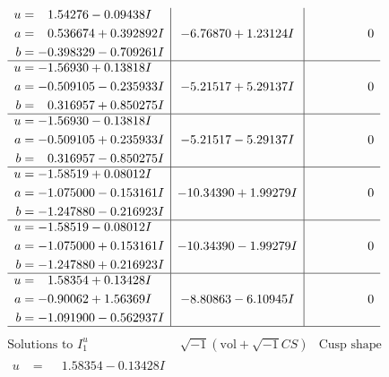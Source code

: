 \documentclass[1p]{elsarticle_modified}
\theoremstyle{definition}
\newcommand{\I}{\sqrt{-1}}
\begin{document}
$$\begin{array}{c|c|c}
\begin{aligned}
u &= \phantom{-}1.54276 - 0.09438 I \\
a &= \phantom{-}0.536674 + 0.392892 I \\
b &= -0.398329 - 0.709261 I\end{aligned}
 & -6.76870 + 1.23124 I & \phantom{-0.000000 } 0 \\ \hline\begin{aligned}
u &= -1.56930 + 0.13818 I \\
a &= -0.509105 - 0.235933 I \\
b &= \phantom{-}0.316957 + 0.850275 I\end{aligned}
 & -5.21517 + 5.29137 I & \phantom{-0.000000 } 0 \\ \hline\begin{aligned}
u &= -1.56930 - 0.13818 I \\
a &= -0.509105 + 0.235933 I \\
b &= \phantom{-}0.316957 - 0.850275 I\end{aligned}
 & -5.21517 - 5.29137 I & \phantom{-0.000000 } 0 \\ \hline\begin{aligned}
u &= -1.58519 + 0.08012 I \\
a &= -1.075000 - 0.153161 I \\
b &= -1.247880 - 0.216923 I\end{aligned}
 & -10.34390 + 1.99279 I & \phantom{-0.000000 } 0 \\ \hline\begin{aligned}
u &= -1.58519 - 0.08012 I \\
a &= -1.075000 + 0.153161 I \\
b &= -1.247880 + 0.216923 I\end{aligned}
 & -10.34390 - 1.99279 I & \phantom{-0.000000 } 0 \\ \hline\begin{aligned}
u &= \phantom{-}1.58354 + 0.13428 I \\
a &= -0.90062 + 1.56369 I \\
b &= -1.091900 - 0.562937 I\end{aligned}
 & -8.80863 - 6.10945 I & \phantom{-0.000000 } 0\\
 \hline 
 \end{array}$$\newpage$$\begin{array}{c|c|c}  
\text{Solutions to }I^u_{1}& \I (\text{vol} + \sqrt{-1}CS) & \text{Cusp shape}\\
 \hline 
\begin{aligned}
u &= \phantom{-}1.58354 - 0.13428 I \\

\end{aligned}
\end{array}$$
\end{document}

